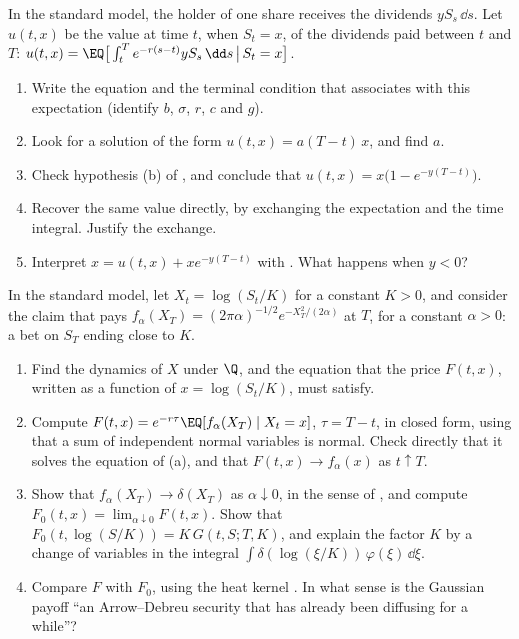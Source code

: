 \begin{exercise}\label{ex:sm-dividend-stream}
\easy In the standard model, the holder of one share receives the dividends $yS_s\,\dd s$. Let
$u(t,x)$ be the value at time $t$, when $S_t=x$, of the dividends paid between $t$ and $T$:
$u(t,x)=\EQ\big[\int_t^Te^{-r(s-t)}yS_s\,\dd s\,\big|\,S_t=x\big]$.
\begin{enumerate}[label=(\alph*)]
  \item Write the equation  and the terminal condition that
     associates with this expectation (identify $b$, $\sigma$, $r$,
    $c$ and $g$).
  \item Look for a solution of the form $u(t,x)=a(T-t)\,x$, and find $a$.
  \item Check hypothesis (b) of , and conclude that
    $u(t,x)=x\big(1-e^{-y(T-t)}\big)$.
  \item Recover the same value directly, by exchanging the expectation and the time integral.
    Justify the exchange.
  \item Interpret $x=u(t,x)+xe^{-y(T-t)}$ with . What happens when $y<0$?
\end{enumerate}
\end{exercise}

\begin{exercise}\label{ex:sm-gaussian-payoff}
\medium In the standard model, let $X_t=\log(S_t/K)$ for a constant $K>0$, and consider the claim
that pays $f_\alpha(X_T)=(2\pi\alpha)^{-1/2}e^{-X_T^2/(2\alpha)}$ at $T$, for a constant $\alpha>0$: a
bet on $S_T$ ending close to $K$.
\begin{enumerate}[label=(\alph*)]
  \item Find the dynamics of $X$ under $\Q$, and the equation that the price $F(t,x)$, written as a
    function of $x=\log(S_t/K)$, must satisfy.
  \item Compute $F(t,x)=e^{-r\tau}\EQ[f_\alpha(X_T)\mid X_t=x]$, $\tau=T-t$, in closed form, using that
    a sum of independent normal variables is normal. Check directly that it solves the equation of
    (a), and that $F(t,x)\to f_\alpha(x)$ as $t\uparrow T$.
  \item Show that $f_\alpha(X_T)\to\delta(X_T)$ as $\alpha\downarrow0$, in the sense of
    , and compute $F_0(t,x)=\lim_{\alpha\downarrow0}F(t,x)$. Show that
    $F_0(t,\log(S/K))=K\,G(t,S;T,K)$, and explain the factor $K$ by a change of variables in the
    integral $\int\delta(\log(\xi/K))\,\varphi(\xi)\,\dd\xi$.
  \item Compare $F$ with $F_0$, using the heat kernel . In what sense is
    the Gaussian payoff ``an Arrow--Debreu security that has already been diffusing for a while''?
\end{enumerate}
\end{exercise}

